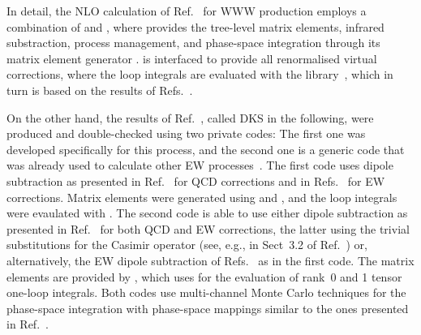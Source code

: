 In detail, the NLO calculation of Ref.~\cite{Schonherr:2018jva} for WWW production
employs a combination of \Sherpa 
\cite{Bothmann:2019yzt,Gleisberg:2008ta,Bothmann:2016nao,Hoeche:2014rya} 
and \Recola \cite{Actis:2012qn,Actis:2016mpe}, where
\Sherpa provides the tree-level matrix elements, 
infrared substraction, process management, and phase-space 
integration through its matrix element generator \Amegic 
\cite{Krauss:2001iv,Gleisberg:2007md,Schonherr:2017qcj}. 
\Recola is interfaced \cite{Biedermann:2017yoi} to provide 
all renormalised virtual corrections, where the loop integrals are evaluated with the
\Collier library~\cite{Denner:2016kdg},
which in turn is based on the results of 
Refs.~\cite{Denner:2002ii,Denner:2005nn,Denner:2010tr}.

On the other hand, the results of Ref.~\cite{Dittmaier:2019twg}, called DKS in the following,
were produced and double-checked using two private codes: 
The first one was developed specifically for this process, 
and the second one is a generic code that was already used to calculate other EW 
processes~\cite{Ballestrero:2018anz,Denner:2019tmn,Denner:2019zfp}.
The first code uses dipole subtraction as presented in Ref.~\cite{Catani:1996vz} for QCD corrections and 
in Refs.~\cite{Dittmaier:1999mb,Dittmaier:2008md} for EW corrections.
Matrix elements were generated using \Madgraph \cite{Alwall:2014hca} and \Recola,
and the loop integrals were evaulated with \Collier.
The second code is able to use either dipole subtraction as presented in Ref.~\cite{Catani:1996vz} 
for both QCD and EW corrections, the latter using the trivial substitutions for the Casimir operator 
(see, e.g., in Sect~3.2 of Ref.~\cite{Kallweit:2014xda}) or, alternatively, 
the EW dipole subtraction of Refs.~\cite{Dittmaier:1999mb,Dittmaier:2008md} 
as in the first code.
The matrix elements are provided by \OpenLoops \cite{Cascioli:2011va,Kallweit:2014xda,Buccioni:2019sur}, 
which uses \Collier for the evaluation of rank~0 and 1 tensor one-loop integrals.
Both codes use multi-channel Monte Carlo techniques \cite{Hilgart:1992xu,Kleiss:1994qy} for the phase-space integration with phase-space mappings similar to the ones presented in Ref.~\cite{Dittmaier:2002ap}.

